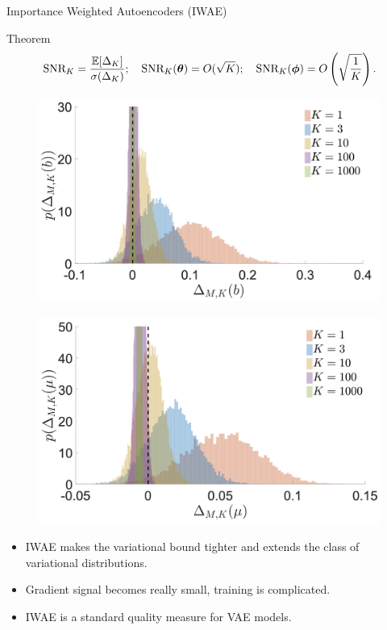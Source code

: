 \documentclass{beamer}
\begin{document}
\begin{frame}{Importance Weighted Autoencoders (IWAE)}
	\begin{block}{Theorem}
		\vspace{-0.5cm}
		\[
		\text{SNR}_K = \frac{\mathbb{E} [\Delta_K]}{\sigma(\Delta_K)}; \quad
		\text{SNR}_K(\boldsymbol{\theta}) = O(\sqrt{K}); \quad 
		\text{SNR}_K(\boldsymbol{\phi}) = O\left(\sqrt{\frac{1}{K}}\right).
		\]
		\vspace{-0.8cm}
	\end{block}
	\begin{minipage}[t]{0.5\columnwidth}
		\begin{figure}[h]
			\centering
			\includegraphics[width=1.\linewidth]{figs/IWAE_SNR_1.png}
		\end{figure}
	\end{minipage}%
	\begin{minipage}[t]{0.5\columnwidth}
		\begin{figure}[h]
			\centering
			\includegraphics[width=1.\linewidth]{figs/IWAE_SNR_2.png}
		\end{figure}
	\end{minipage}
	\begin{itemize}
		\item IWAE makes the variational bound tighter and extends the class of variational distributions.
		\item Gradient signal becomes really small, training is complicated.
		\item IWAE is a standard quality measure for VAE models.
	\end{itemize}
\end{frame}
\end{document}

